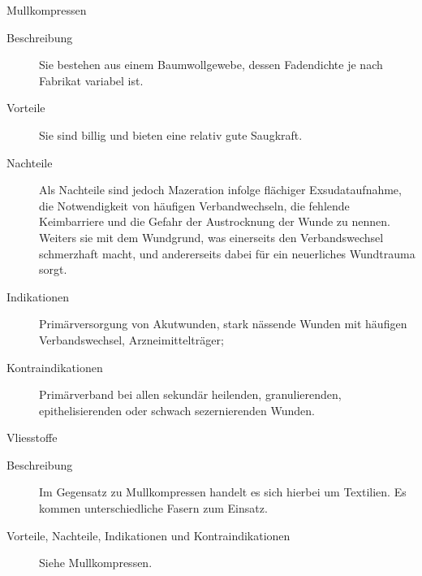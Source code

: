 \Text
{Mullkompressen}
{ 
\begin{description}
  \item[Beschreibung] Sie bestehen aus einem Baumwollgewebe,
  dessen Fadendichte je
nach Fabrikat variabel ist.
  \item[Vorteile] Sie sind billig und bieten eine
relativ gute Saugkraft. 
  \item[Nachteile] Als Nachteile sind jedoch Mazeration
infolge  flächiger Exsudataufnahme, die Notwendigkeit von
häufigen Verbandwechseln, die fehlende Keimbarriere und die
Gefahr der Austrocknung der Wunde zu nennen. Weiters
 sie mit dem Wundgrund, was einerseits den
Verbandswechsel schmerzhaft macht, und andererseits dabei
für ein neuerliches Wundtrauma sorgt.
  \item[Indikationen] Primärversorgung von Akutwunden, stark
  nässende Wunden mit häufigen Verbandswechsel,
  Arzneimittelträger; 
  \item[Kontraindikationen] Primärverband bei allen sekundär
  heilenden, granulierenden, epithelisierenden oder schwach
  sezernierenden Wunden.
\end{description}
}
{}
{}
{}
{}

\Text
{Vliesstoffe}
{
\begin{description}
  \item[Beschreibung] Im Gegensatz zu Mullkompressen handelt
  es sich hierbei um  Textilien. Es kommen
  unterschiedliche Fasern zum Einsatz.
  \item[Vorteile, Nachteile, Indikationen und Kontraindikationen] Siehe Mullkompressen.
\end{description}

}
{}
{}
{}
{}

